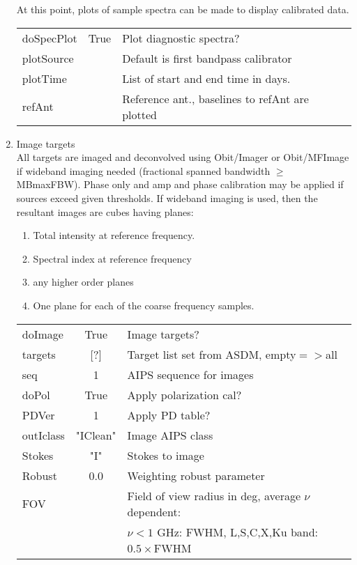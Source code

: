 \documentclass[11pt]{article}
\begin{document}
\begin{enumerate}
At this point, plots of sample spectra can be made to display
calibrated data.
\begin{center}
\begin{tabular}{|l|c|l|}
\hline
doSpecPlot     & True &  Plot diagnostic spectra?\\
plotSource     &      & Default is first bandpass calibrator\\
plotTime       &      & List of start and end time in days.\\
refAnt         &      & Reference ant., baselines to refAnt are plotted \\
\hline
\end{tabular}
\end{center}
%
\item Image targets \\
All targets are imaged and deconvolved using Obit/Imager or
Obit/MFImage if wideband imaging needed (fractional spanned bandwidth
$\ge$ MBmaxFBW).
Phase only and amp and phase calibration may be applied if sources
exceed given thresholds.
If wideband imaging is used, then the resultant images are cubes
having planes:
\begin{enumerate}
\item Total intensity at reference frequency.
\item Spectral index at reference frequency
\item any higher order planes
\item One plane for each of the coarse frequency samples.
\end{enumerate}
\begin{center}
\begin{tabular}{|l|c|l|}
\hline
doImage     & True     & Image targets? \\
targets     & [?]       & Target list set from ASDM, empty$=>$all\\
seq         & 1        & AIPS sequence for images \\
doPol       & True     & Apply polarization cal?\\
PDVer       &  1       & Apply PD table?\\
outIclass   & "IClean" & Image AIPS class\\
Stokes      & "I"      & Stokes to image \\
Robust      & 0.0      & Weighting robust parameter\\
FOV         &          & Field of view radius in deg, average $\nu$ dependent:\\
            &          & $\nu<1$ GHz: FWHM, L,S,C,X,Ku band: $0.5\times$FWHM\\

\end{tabular}
\end{center}
\end{enumerate}
\end{document}
